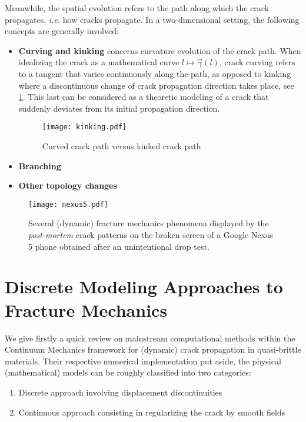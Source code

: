 Meanwhile, the spatial evolution refers to the path along which the crack propagates, \emph{i.e.} how cracks propagate. In a two-dimensional setting, the following concepts are generally involved:
\begin{itemize}
\item \textbf{Curving and kinking} concerns curvature evolution of the crack path. When idealizing the crack as a mathematical curve $l\mapsto\vec{\gamma}(l)$, crack curving refers to a tangent that varies continuously along the path, as opposed to kinking where a discontinuous change of crack propagation direction takes place, see \cref{fig:kink}. This last can be considered as a theoretic modeling of a crack that suddenly deviates from its initial propagation direction.
\begin{figure}[htbp]
\centering
\texttt{[image: kinking.pdf]}
\caption{Curved crack path versus kinked crack path} \label{fig:kink}
\end{figure}

\item \textbf{Branching}
\item \textbf{Other topology changes}
\end{itemize}


\begin{figure}[htbp]
\centering
\texttt{[image: nexus5.pdf]}
\caption{Several (dynamic) fracture mechanics phenomena displayed by the \emph{post-mortem} crack patterns on the broken screen of a Google Nexus 5 phone obtained after an unintentional drop test.}
\end{figure}

\section{Discrete Modeling Approaches to Fracture Mechanics} \label{sec:discretemodels}
We give firstly a quick review on mainstream computational methods within the Continuum Mechanics framework for (dynamic) crack propagation in quasi-brittle materials. Their respective numerical implementation put aside, the physical (mathematical) models can be roughly classified into two categories:
\begin{enumerate}
\item Discrete approach involving displacement discontinuities
\item Continuous approach consisting in regularizing the crack by smooth fields
\end{enumerate}

